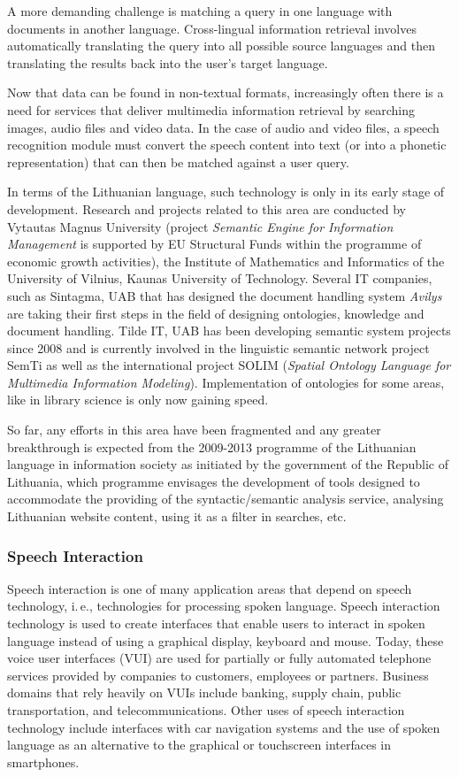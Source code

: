 \documentclass[]{../metanetpaper}
\begin{document}
\begin{multicols}{2}
A more demanding challenge is matching a query in one language with documents in another language. Cross-lingual information retrieval involves automatically translating the query into all possible source languages and then translating the results back into the user's target language.

Now that data can be found in non-textual formats, increasingly often there is a need for services that deliver multimedia information retrieval by searching images, audio files and video data. In the case of audio and video files, a speech recognition module must convert the speech content into text (or into a phonetic representation) that can then be matched against a user query.

   In terms of the Lithuanian language, such technology is only in its early stage of development. Research and projects related to this area are conducted by Vytautas Magnus University (project \textit{Semantic Engine for Information Management} is supported by EU Structural Funds within the programme of economic growth activities), the Institute of Mathematics and Informatics of the University of Vilnius, Kaunas University of Technology. Several IT companies, such as Sintagma, UAB that has designed the document handling system \textit{Avilys} are taking their first steps in the field of designing ontologies, knowledge and document handling. Tilde IT, UAB has been developing semantic system projects since 2008 and is currently involved in the linguistic semantic network project SemTi as well as the international project SOLIM (\textit{Spatial Ontology Language for Multimedia Information Modeling}). Implementation of ontologies for some areas, like in library science is only now gaining speed.

    So far, any efforts in this area have been fragmented and any greater breakthrough is expected from the 2009-2013 programme of the Lithuanian language in information society as initiated by the government of the Republic of Lithuania, which programme envisages the development of tools designed to accommodate the providing of the syntactic/semantic analysis service, analysing Lithuanian website content, using it as a filter in searches, etc.

\subsubsection{Speech Interaction}

Speech interaction is one of many application areas that depend on speech technology, i.\,e., technologies for processing spoken language. Speech interaction technology is used to create interfaces that enable users to interact in spoken language instead of using a graphical display, keyboard and mouse.  Today, these voice user interfaces (VUI) are used for partially or fully automated telephone services provided by companies to customers, employees or partners. Business domains that rely heavily on VUIs include banking, supply chain, public transportation, and telecommunications. Other uses of speech interaction technology include interfaces with car navigation systems and the use of spoken language as an alternative to the graphical or touchscreen interfaces in smartphones.


\end{multicols}
\end{document}
